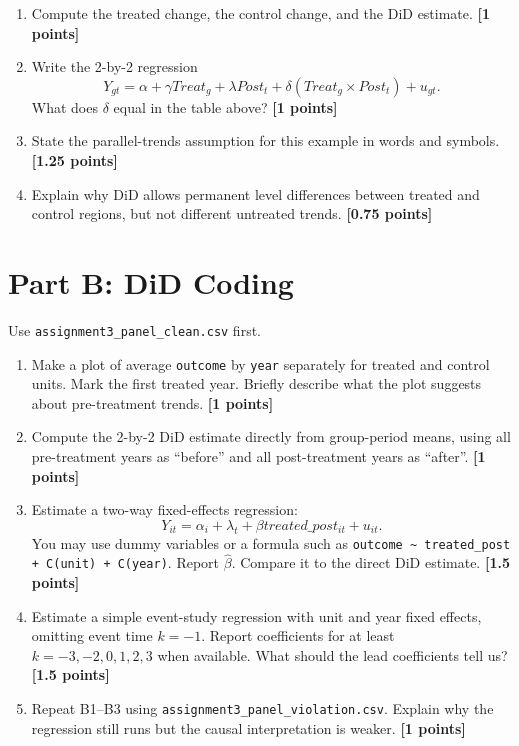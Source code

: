 \documentclass[11pt]{article}
\newcommand{\points}[1]{\hfill \textbf{[#1 points]}}
\begin{document}
\begin{enumerate}[label=A\arabic*.]
  \item Compute the treated change, the control change, and the DiD estimate. \points{1}

  \item Write the 2-by-2 regression
  \[
    Y_{gt}=\alpha+\gamma Treat_g+\lambda Post_t+\delta(Treat_g\times Post_t)+u_{gt}.
  \]
  What does \(\delta\) equal in the table above? \points{1}

  \item State the parallel-trends assumption for this example in words and symbols. \points{1.25}

  \item Explain why DiD allows permanent level differences between treated and control regions, but not different untreated trends. \points{0.75}
\end{enumerate}

\section*{Part B: DiD Coding}

Use \texttt{assignment3\_panel\_clean.csv} first.

\begin{enumerate}[label=B\arabic*.]
  \item Make a plot of average \texttt{outcome} by \texttt{year} separately for treated and control units. Mark the first treated year. Briefly describe what the plot suggests about pre-treatment trends. \points{1}

  \item Compute the 2-by-2 DiD estimate directly from group-period means, using all pre-treatment years as ``before'' and all post-treatment years as ``after''. \points{1}

  \item Estimate a two-way fixed-effects regression:
  \[
    Y_{it}=\alpha_i+\lambda_t+\beta treated\_post_{it}+u_{it}.
  \]
  You may use dummy variables or a formula such as \texttt{outcome \textasciitilde{} treated\_post + C(unit) + C(year)}. Report \(\hat{\beta}\). Compare it to the direct DiD estimate. \points{1.5}

  \item Estimate a simple event-study regression with unit and year fixed effects, omitting event time \(k=-1\). Report coefficients for at least \(k=-3,-2,0,1,2,3\) when available. What should the lead coefficients tell us? \points{1.5}

  \item Repeat B1--B3 using \texttt{assignment3\_panel\_violation.csv}. Explain why the regression still runs but the causal interpretation is weaker. \points{1}
\end{enumerate}
\end{document}
